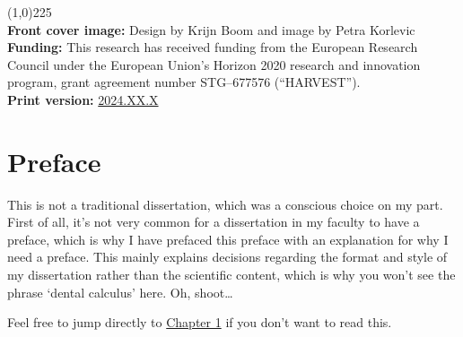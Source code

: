 \documentclass[
  b5paper,
]{book}
\renewcommand*\contentsname{Table of contents}
\newcommand\contentsname{Table of contents}
\begin{document}
\begingroup
\hspace{0.000001cm}
\vfill
\begin{flushleft}
\line(1,0){225} \\ %
\textbf{Front cover image:} Design by Krijn Boom and image by Petra
Korlevic \\[0.4cm]
\textbf{Funding:} This research has received funding from the European
Research Council under the European Union's Horizon 2020 research and
innovation program, grant agreement number STG--677576
(``HARVEST''). \\[0.4cm] 
\textbf{Print version:} \href{https://github.com/}{2024.XX.X}
\end{flushleft}
\endgroup

\frontmatter
%
\ifdefined\Shaded\renewenvironment{Shaded}{\begin{tcolorbox}[borderline west={3pt}{0pt}{shadecolor}, interior hidden, sharp corners, frame hidden, boxrule=0pt, breakable, enhanced]}{\end{tcolorbox}}\fi

\renewcommand*\contentsname{Table of contents}
{
\setcounter{tocdepth}{2}
\tableofcontents
}
\listoffigures
\listoftables
{}
\mainmatter
\hypertarget{preface}{}

\chapter*{Preface}


This is not a traditional dissertation, which was a conscious choice on
my part. First of all, it's not very common for a dissertation in my
faculty to have a preface, which is why I have prefaced this preface
with an explanation for why I need a preface. This mainly explains
decisions regarding the format and style of my dissertation rather than
the scientific content, which is why you won't see the phrase `dental
calculus' here. Oh, shoot\ldots{}

Feel free to jump directly to \protect\hyperlink{chap-intro}{Chapter 1}
if you don't want to read this.
\end{document}
